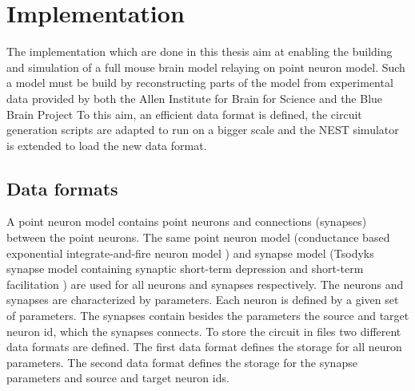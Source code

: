 %

\chapter{Implementation}

The implementation which are done in this thesis aim at enabling the building and simulation
of a full mouse brain model relaying on point neuron model. Such a model must be build by
reconstructing parts of the model from experimental data provided by both the Allen Institute for
Brain for Science and the Blue Brain Project
To this aim, an efficient data format is defined, the circuit generation scripts are adapted to
run on a bigger scale and the NEST simulator is extended to load the new data format.

\section{Data formats}
\label{sec:dataformats}
A point neuron model contains point neurons and connections (synapses) between the point neurons.
The same point neuron model (conductance based exponential integrate-and-fire neuron model \cite{brette2005adaptive}) and synapse model (Tsodyks synapse model containing synaptic short-term depression and short-term facilitation \cite{tsodyks1997neural, fuhrmann2002coding}) are used for all neurons and synapses respectively.
The neurons and synapses are characterized by parameters.
Each neuron is defined by a given set of parameters.
The synapses contain besides the parameters the source and target neuron id, which the synapses connects.
To store the circuit in files two different data formats are defined.
The first data format defines the storage for all neuron parameters.
The second data format defines the storage for the synapse parameters and source and target neuron ids.


